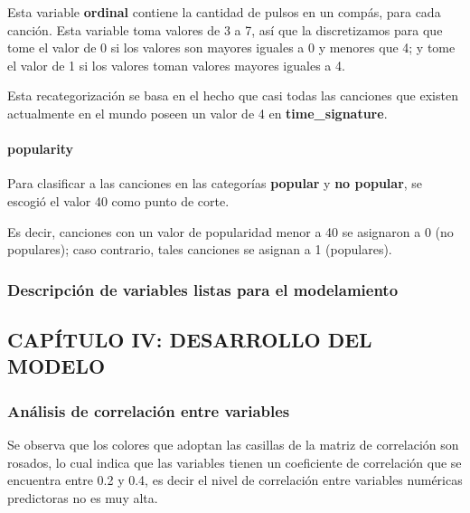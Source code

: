 \documentclass[
  letterpaper,
  DIV=11,
  numbers=noendperiod]{scrartcl}
\let\oldparagraph\paragraph
\renewcommand{\paragraph}[1]{\oldparagraph{#1}\mbox{}}
\begin{document}
Esta variable \textbf{ordinal} contiene la cantidad de pulsos en un
compás, para cada canción. Esta variable toma valores de 3 a 7, así que
la discretizamos para que tome el valor de 0 si los valores son mayores
iguales a 0 y menores que 4; y tome el valor de 1 si los valores toman
valores mayores iguales a 4.

Esta recategorización se basa en el hecho que casi todas las canciones
que existen actualmente en el mundo poseen un valor de 4 en
\textbf{time\_signature}.

\hypertarget{popularity}{%
\paragraph{popularity}\label{popularity}}

Para clasificar a las canciones en las categorías \textbf{popular} y
\textbf{no popular}, se escogió el valor 40 como punto de corte.

Es decir, canciones con un valor de popularidad menor a 40 se asignaron
a 0 (no populares); caso contrario, tales canciones se asignan a 1
(populares).

\hypertarget{descripciuxf3n-de-variables-listas-para-el-modelamiento}{%
\subsubsection{Descripción de variables listas para el
modelamiento}\label{descripciuxf3n-de-variables-listas-para-el-modelamiento}}

\hypertarget{capuxedtulo-iv-desarrollo-del-modelo}{%
\subsection{CAPÍTULO IV: DESARROLLO DEL
MODELO}\label{capuxedtulo-iv-desarrollo-del-modelo}}

\hypertarget{anuxe1lisis-de-correlaciuxf3n-entre-variables}{%
\subsubsection{Análisis de correlación entre
variables}\label{anuxe1lisis-de-correlaciuxf3n-entre-variables}}

Se observa que los colores que adoptan las casillas de la matriz de
correlación son rosados, lo cual indica que las variables tienen un
coeficiente de correlación que se encuentra entre 0.2 y 0.4, es decir el
nivel de correlación entre variables numéricas predictoras no es muy
alta.
\end{document}
